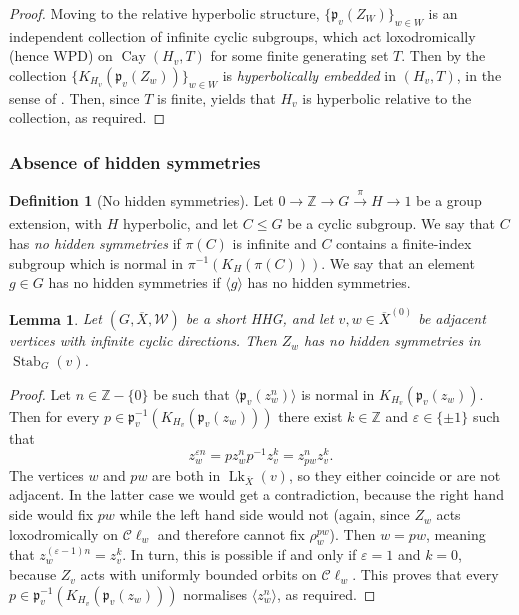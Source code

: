 \documentclass[svgnames]{amsart}
\theoremstyle{plain}
\newtheorem{lemma}[thm]{Lemma}
\theoremstyle{definition}
\newtheorem{defn}[thm]{Definition}
\newcommand{\Z}{\mathbb{Z}}
\newcommand{\Cay}[2]{\operatorname{Cay}\left(#1,#2\right)}
\newcommand{\C}{\mathcal C}
\newcommand{\ov}[1]{\overline{#1}}
\newcommand{\link}{\operatorname{Lk}}
\newcommand{\Stab}[2]{\operatorname{Stab}_{#1}(#2)}
\newcommand{\W}{\mathcal{W}}
\newcommand{\p}{\mathfrak{p}}
\begin{document}
\begin{proof}
Moving to the relative hyperbolic structure, $\{\p_v(Z_W)\}_{w\in W}$ is an independent collection of infinite cyclic subgroups, which act loxodromically (hence WPD) on $\Cay{H_v}{T}$ for some finite generating set $T$. Then by \cite[Theorem 6.8]{DGO} the collection $\{K_{H_v}(\p_v(Z_w))\}_{w\in W}$ is \emph{hyperbolically embedded} in $(H_v,T)$, in the sense of \cite[Definition 2.1]{DGO}. Then, since $T$ is finite, \cite[Proposition 4.28]{DGO} yields that $H_v$ is hyperbolic relative to the collection, as required.
\end{proof}

\subsubsection{Absence of hidden symmetries}

\begin{defn}[No hidden symmetries]\label{defn:hiddensymm_general}
    Let $0\to \Z\to G\xrightarrow[]{\pi} H\to 1$ be a group extension, with $H$ hyperbolic, and let $C\le G$ be a cyclic subgroup. We say that $C$ has \emph{no hidden symmetries} if $\pi(C)$ is infinite and $C$ contains a finite-index subgroup which is normal in $\pi^{-1}(K_H(\pi(C)))$. We say that an element $g\in G$ has no hidden symmetries if $\langle g\rangle$ has no hidden symmetries.
\end{defn}

\begin{lemma}\label{lem:nohidden}
    Let $(G,\ov X, \W)$ be a short HHG, and let $v,w\in \ov X^{(0)}$ be adjacent vertices with infinite cyclic directions. Then $Z_w$ has no hidden symmetries in $\Stab{G}{v}$.
\end{lemma}

\begin{proof} 
    Let $n\in \Z-\{0\}$ be such that $\langle \p_v(z_w^n)\rangle$ is normal in $K_{H_v}(\p_v(z_w))$. Then for every $p\in \p_v^{-1}(K_{H_v}(\p_v(z_w)))$ there exist $k\in \Z$ and $\varepsilon\in \{\pm 1\}$ such that $$z_w^{\varepsilon n}=pz_w^np^{-1}z_v^k=z_{pw}^nz_v^k.$$
    The vertices $w$ and $pw$ are both in $\link_{\ov X}(v)$, so they either coincide or are not adjacent. In the latter case we would get a contradiction, because the right hand side would fix $pw$ while the left hand side would not (again, since $Z_w$ acts loxodromically on $\C\ell_w$ and therefore cannot fix $\rho^{pw}_w$). Then $w=pw$, meaning that $z_w^{(\varepsilon -1)n}=z_v^k$. In turn, this is possible if and only if $\varepsilon=1$ and $k=0$, because $Z_v$ acts with uniformly bounded orbits on $\C\ell_w$. This proves that every $p\in \p_v^{-1}(K_{H_v}(\p_v(z_w)))$ normalises $\langle z_w^n\rangle$, as required.
\end{proof}
\end{document}
